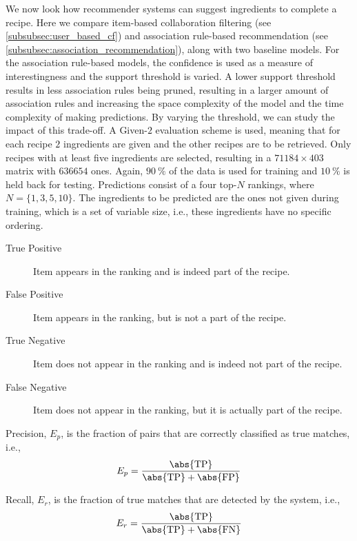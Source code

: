 We now look how recommender systems can suggest ingredients to complete a recipe.
Here we compare item-based collaboration filtering (see \cref{subsubsec:user_based_cf}) and association rule-based recommendation (see \cref{subsubsec:association_recommendation}), along with two baseline models.
For the association rule-based models, the confidence is used as a measure of interestingness and the support threshold is varied.
A lower support threshold results in less association rules being pruned, resulting in a larger amount of association rules and increasing the space complexity of the model and the time complexity of making predictions.
By varying the threshold, we can study the impact of this trade-off.
A Given-$2$ evaluation scheme is used, meaning that for each recipe $2$ ingredients are given and the other recipes are to be retrieved.
Only recipes with at least five ingredients are selected, resulting in a $\num{71184} \times 403$ matrix with $\num{636654}$ ones.
Again, $\SI{90}{\percent}$ of the data is used for training and $\SI{10}{\percent}$ is held back for testing.
Predictions consist of a four top-$N$ rankings, where $N=\{1,3,5,10\}$.
The ingredients to be predicted are the ones not given during training, which is a set of variable size, i.e., these ingredients have no specific ordering.

\begin{description}
	\item [True Positive] Item appears in the ranking and is indeed part of the recipe.
	\item [False Positive] Item appears in the ranking, but is not a part of the recipe.
	\item [True Negative] Item does not appear in the ranking and is indeed not part of the recipe.
	\item [False Negative] Item does not appear in the ranking, but it is actually part of the recipe.	
\end{description}

\begin{definition}[Precision]
    Precision, $E_{p}$, is the fraction of pairs that are correctly classified as true matches, i.e.,
    \begin{equation*}
        E_{p} = \frac{ \abs{\text{TP}} }{ \abs{\text{TP}} + \abs{\text{FP}} }
    \end{equation*}
\end{definition}

\begin{definition}[Recall]
    Recall, $E_{r}$, is the fraction of true matches that are detected by the system, i.e.,
    \begin{equation*}
        E_{r} = \frac{ \abs{\text{TP}} }{ \abs{\text{TP}} + \abs{\text{FN}} }
    \end{equation*}
\end{definition}


